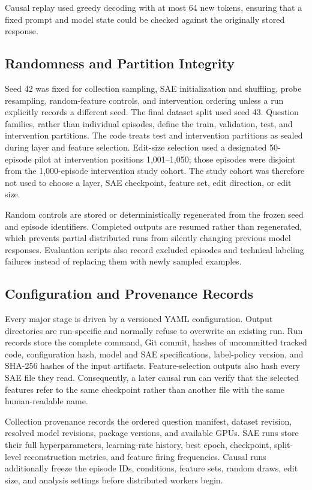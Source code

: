 Causal replay used greedy decoding with at most 64 new tokens, ensuring that a
fixed prompt and model state could be checked against the originally stored
response.

\subsection{Randomness and Partition Integrity}

Seed 42 was fixed for collection sampling, SAE initialization and shuffling,
probe resampling, random-feature controls, and intervention ordering unless a
run explicitly records a different seed. The final dataset split used seed 43.
Question families, rather than
individual episodes, define the train, validation, test, and intervention
partitions. The code treats test and intervention partitions as sealed during
layer and feature selection. Edit-size selection used a designated 50-episode
pilot at intervention positions 1,001--1,050; those episodes were disjoint from
the 1,000-episode intervention study cohort. The study cohort was therefore not
used to choose a layer, SAE checkpoint, feature set, edit direction, or edit
size.

Random controls are stored or deterministically regenerated from the frozen
seed and episode identifiers. Completed outputs are resumed rather than
regenerated, which prevents partial distributed runs from silently changing
previous model responses. Evaluation scripts also record excluded episodes and
technical labeling failures instead of replacing them with newly sampled
examples.

\subsection{Configuration and Provenance Records}

Every major stage is driven by a versioned YAML configuration. Output
directories are run-specific and normally refuse to overwrite an existing
run. Run records store the complete command, Git commit, hashes of uncommitted
tracked code, configuration hash, model and SAE specifications, label-policy
version, and SHA-256 hashes of the input artifacts. Feature-selection outputs
also hash every SAE file they read. Consequently, a later causal run can verify
that the selected features refer to the same checkpoint rather than another
file with the same human-readable name.

Collection provenance records the ordered question manifest, dataset revision,
resolved model revisions, package versions, and available GPUs. SAE runs store
their full hyperparameters, learning-rate history, best epoch, checkpoint,
split-level reconstruction metrics, and feature firing frequencies. Causal
runs additionally freeze the episode IDs, conditions, feature sets, random
draws, edit size, and analysis settings before distributed workers begin.

